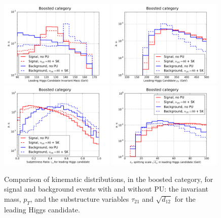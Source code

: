 \begin{figure}[t]
  \begin{center}
  \includegraphics[width=0.49\textwidth]{plots/m_h0_bst_comp_back.pdf}
  \includegraphics[width=0.49\textwidth]{plots/pt_h0_bst_comp_back.pdf}
   \includegraphics[width=0.49\textwidth]{plots/tau21_h1_bst_comp_back.pdf}
  \includegraphics[width=0.49\textwidth]{plots/split12_h0_bst_comp_back.pdf}
   \caption{\small
     Comparison of kinematic distributions, in
     the boosted category, for signal and background events
     with and without PU: the invariant mass,  $p_T$,
     and the substructure variables $\tau_{21}$ and $\sqrt{d_{12}}$
    for the leading Higgs candidate.
 }
\label{fig:signal-vs-back-boosted}
\end{center}
\end{figure}



